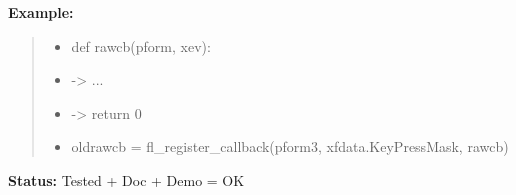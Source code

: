 \begin{boxedminipage}{\funcwidth}
\textbf{Example:}
\begin{quote}
  \begin{itemize}

  \item
    \setlength{\parskip}{0.6ex}
def rawcb(pform, xev):



  \item {\textbar}-{\textgreater}{\textbar} ...



  \item {\textbar}-{\textgreater}{\textbar} return 0



  \item oldrawcb = fl\_register\_callback(pform3, xfdata.KeyPressMask, rawcb)



\end{itemize}

\end{quote}

\textbf{Status:} Tested + Doc + Demo = OK



    \end{boxedminipage}

    \label{xformslib:flbasic:fl_register_raw_callback}

    \vspace{0.5ex}

